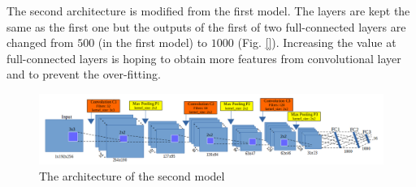The second architecture is modified from the first model. The layers are kept the same as the first one but the outputs of the first of two full-connected layers are changed from $500$ (in the first model) to $1000$ (Fig. \ref{}). Increasing the value at full-connected layers is hoping to obtain more features from convolutional layer and to prevent the over-fitting. 

\begin{figure}[h]
	\centering
	\includegraphics[scale=0.4]{images/net2}
	\caption{The architecture of the second model}
	\label{fignet2}
\end{figure}

